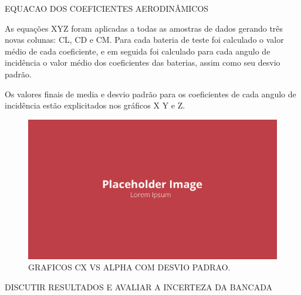 EQUACAO DOS COEFICIENTES AERODINÂMICOS

As equações XYZ foram aplicadas a todas as amostras de dados gerando três novas colunas: CL, CD e CM. Para cada bateria de teste foi calculado o valor médio de cada coeficiente, e em seguida foi calculado para cada angulo de incidência o valor médio dos coeficientes das baterias, assim como seu desvio padrão.

Os valores finais de media e desvio padrão para os coeficientes de cada angulo de incidência estão explicitados nos gráficos X Y e Z.

\begin{figure}[!ht]
    \centering
    \includegraphics[width=.8\linewidth]{figuras/outras/placeholder.png}
    \caption{GRAFICOS CX VS ALPHA COM DESVIO PADRAO\cite{autor}.}
    \label{fig:placeholder}
\end{figure}

DISCUTIR RESULTADOS E AVALIAR A INCERTEZA DA BANCADA

